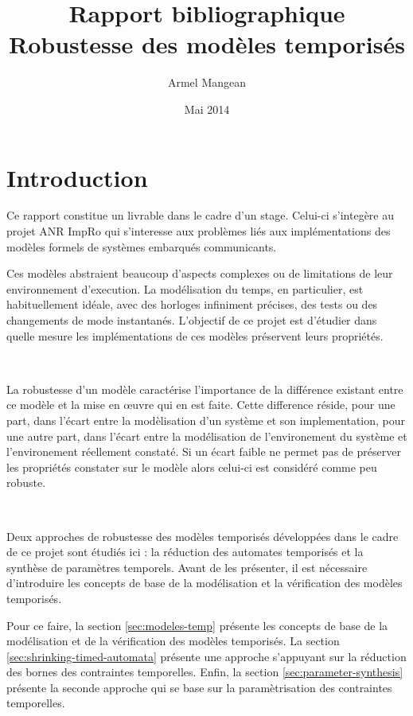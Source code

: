 \documentclass{article}
\title{Rapport bibliographique \\
{\bf Robustesse des modèles temporisés}}
\author{Armel Mangean}
\date{Mai 2014}
\begin{document}
  \maketitle
  \vspace{2em}
  \tableofcontents
  \thispagestyle{empty}

  \newpage
  \setcounter{page}{1}
  \section{Introduction}

    Ce rapport constitue un livrable dans le cadre d'un stage. Celui-ci
    s'integère au projet ANR ImpRo\footnotemark{} qui s'interesse aux problèmes
    liés aux implémentations des modèles formels de systèmes embarqués
    communicants.


    Ces modèles abstraient beaucoup d'aspects complexes ou de limitations de
    leur environnement d'execution. La modélisation du temps, en particulier,
    est habituellement idéale, avec des horloges infiniment précises, des tests
    ou des changements de mode instantanés. L'objectif de ce projet est
    d'étudier dans quelle mesure les implémentations de ces modèles préservent
    leurs propriétés.

    ~
    
    La robustesse d'un modèle caractérise l'importance de la différence existant
    entre ce modèle et la mise en \oe uvre qui en est faite. Cette difference
    réside, pour une part, dans l'écart entre la modèlisation d'un système et
    son implementation, pour une autre part, dans l'écart entre la modélisation
    de l'environement du système et l'environement réellement constaté. Si un
    écart faible ne permet pas de préserver les propriétés constater sur le
    modèle alors celui-ci est considéré comme peu robuste.

    ~
    
    Deux approches de robustesse des modèles temporisés développées dans le
    cadre de ce projet sont étudiés ici : la réduction des automates temporisés
    et la synthèse de paramètres temporels. Avant de les présenter, il est
    nécessaire d'introduire les concepts de base de la modélisation et la
    vérification des modèles temporisés.

    Pour ce faire, la section \ref{sec:modeles-temp} présente les concepts de
    base de la modélisation et de la vérification des modèles temporisés. La
    section \ref{sec:shrinking-timed-automata} présente une approche s'appuyant
    sur la réduction des bornes des contraintes temporelles. Enfin, la section
    \ref{sec:parameter-synthesis} présente la seconde approche qui se base sur
    la paramètrisation des contraintes temporelles.
\end{document}

